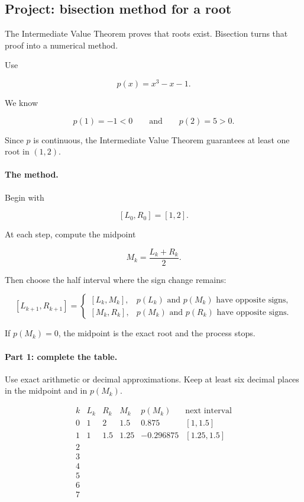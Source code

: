 \subsection{Project: bisection method for a root}
\label{subsec:bisection-project}

The Intermediate Value Theorem proves that roots exist.  Bisection turns that proof into a numerical method.

Use

\[
p(x)=x^3-x-1.
\]

We know

\[
p(1)=-1<0
\qquad\text{and}\qquad
p(2)=5>0.
\]

Since \(p\) is continuous, the Intermediate Value Theorem guarantees at least one root in \((1,2)\).

\paragraph{The method.}
Begin with

\[
[L_0,R_0]=[1,2].
\]

At each step, compute the midpoint

\[
M_k=\frac{L_k+R_k}{2}.
\]

Then choose the half interval where the sign change remains:

\[
[L_{k+1},R_{k+1}]
=
\begin{cases}
[L_k,M_k], & p(L_k)\text{ and }p(M_k)\text{ have opposite signs},\\
[M_k,R_k], & p(M_k)\text{ and }p(R_k)\text{ have opposite signs}.
\end{cases}
\]

If \(p(M_k)=0\), the midpoint is the exact root and the process stops.

\paragraph{Part 1: complete the table.}
Use exact arithmetic or decimal approximations.  Keep at least six decimal places in the midpoint and in \(p(M_k)\).

\[
\begin{array}{c|c|c|c|c|c}
k & L_k & R_k & M_k & p(M_k) & \text{next interval} \\ \hline
0 & 1 & 2 & 1.5 & 0.875 & [1,1.5] \\
1 & 1 & 1.5 & 1.25 & -0.296875 & [1.25,1.5] \\
2 & & & & & \\
3 & & & & & \\
4 & & & & & \\
5 & & & & & \\
6 & & & & & \\
7 & & & & &
\end{array}
\]


